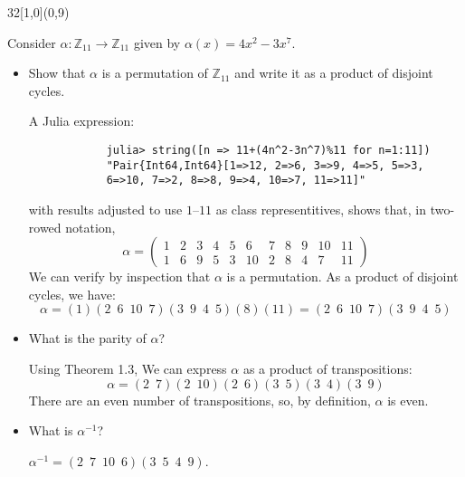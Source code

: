 \documentclass[12pt]{article}
\newcommand{\zee}{\mathbb{Z}}
\newenvironment{exercise}[2]{\begin{textblock}{32}[1,0](0,#2)\noindent#1\end{textblock}}{\vspace{1in}}
\begin{document}
\begin{exercise}{1.29}{9} %
	{\noindent}Consider $\alpha: \zee_{11}\to \zee_{11}$ given by $\alpha(x)=4x^2-3x^7$.
	\begin{itemize}
		\item Show that $\alpha$ is a permutation of $\zee_{11}$ and write it as a product of disjoint cycles.
		\bigskip

		A Julia expression:
		\begin{verbatim}
			julia> string([n => 11+(4n^2-3n^7)%11 for n=1:11])
			"Pair{Int64,Int64}[1=>12, 2=>6, 3=>9, 4=>5, 5=>3,
			6=>10, 7=>2, 8=>8, 9=>4, 10=>7, 11=>11]"
		\end{verbatim}
		with results adjusted to use $1$--$11$ as class representitives, shows that, in two-rowed notation,
		\[
		\alpha = \left(
			\begin{array}{rrrrrrrrrrr}
		    1 &  2 &  3 &  4 &  5 &  6 &  7 &  8 &  9 & 10 & 11 \\
		    1 &  6 &  9 &  5 &  3 & 10 &  2 &  8 &  4 &  7 & 11
		  \end{array}
			\right)
		\]
		We can verify by inspection that $\alpha$ is a permutation. As a product of disjoint cycles, we have:
		\[ \alpha = (1)(2\enspace6\enspace10\enspace7)(3\enspace9\enspace4\enspace5)(8)(11) = (2\enspace6\enspace10\enspace7)(3\enspace9\enspace4\enspace5) \]

		\item What is the parity of $\alpha$?
		\bigskip

		Using Theorem 1.3, We can express $\alpha$ as a product of transpositions:
		\[ \alpha = (2\enspace7)(2\enspace10)(2\enspace6)(3\enspace5)(3\enspace4)(3\enspace9) \]
		There are an even number of transpositions, so, by definition, $\alpha$ is even.

		\item What is $\alpha^{-1}$?
		\bigskip

		$\alpha^{-1}=(2\enspace7\enspace10\enspace6)(3\enspace5\enspace4\enspace9)$.
	\end{itemize}
\end{exercise}
\end{document}
